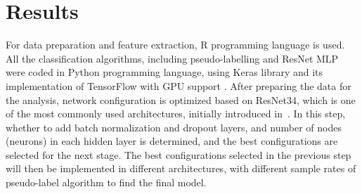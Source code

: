 \section{Results}
\label{S:w5}
 For data preparation and feature extraction, R programming language is used. All the classification algorithms, including pseudo-labelling and ResNet MLP were coded in Python programming language, using Keras library \cite{chollet2015keras} and its implementation of TensorFlow with GPU support \cite{tensorflow2015-whitepaper}. After preparing the data for the analysis, network configuration is optimized based on ResNet34, which is one of the most commonly used architectures, initially introduced in~\cite{he2016deep}. In this step, whether to add batch normalization and dropout layers, and number of nodes (neurons) in each hidden layer is determined, and the best configurations are selected for the next stage. The best configurations selected in the previous step will then be implemented in different architectures, with different sample rates of pseudo-label algorithm to find the final model. 
